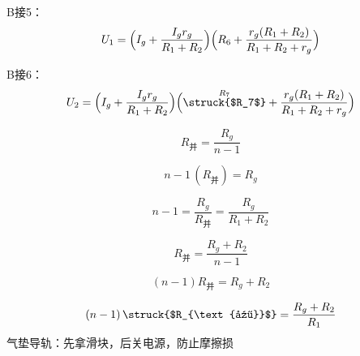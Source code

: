 B接5：
\[
U_1=\Bigl(I_g+\frac{I_gr_g}{R_1+R_2}\Bigr)\Bigl(R_6+\frac{r_g(R_1+R_2)}{R_1+R_2+r_g}\Bigr)
\]

B接6：
\[
U_2=\Bigl(I_g+\frac{I_gr_g}{R_1+R_2}\Bigr)\Bigl(\overset{R_7}{\text{\struck{$R_7$}}}+\frac{r_g(R_1+R_2)}{R_1+R_2+r_g}\Bigr) %
\]

\[
R_{\text{并}}=\frac{R_g}{n-1}
\]

\[
n-1\,(R_{\text{并}})=R_g
\]

\[
n-1=\frac{R_g}{R_{\text{并}}}=\frac{R_g}{R_1+R_2}
\]

\[
R_{\text{并}}=\frac{R_g+R_2}{n-1}
\]

\[
(n-1)R_{\text{并}}=R_g+R_2
\]

\[
(n-1)\,\text{\struck{$R_{\text{并}}$}}=\frac{R_g+R_2}{R_1} %
\]
气垫导轨：先拿滑块，后关电源，防止摩擦损 %
